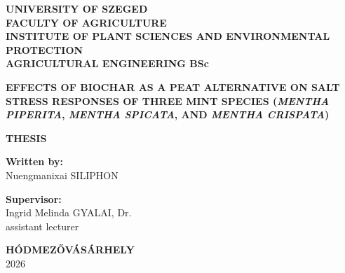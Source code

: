 \begin{titlepage}

\noindent
\textbf{UNIVERSITY OF SZEGED}\\
\textbf{FACULTY OF AGRICULTURE}\\
\textbf{INSTITUTE OF PLANT SCIENCES AND ENVIRONMENTAL PROTECTION}\\
\textbf{AGRICULTURAL ENGINEERING BSc}

\vspace{3cm}

\begin{center}
\fontsize{14}{16}\selectfont
\textbf{
EFFECTS OF BIOCHAR AS A PEAT ALTERNATIVE ON SALT STRESS RESPONSES OF THREE MINT SPECIES (\textit{MENTHA PIPERITA}, \textit{MENTHA SPICATA}, AND \textit{MENTHA CRISPATA})
}
\end{center}

\vspace{3cm}

\begin{center}
\textbf{THESIS}
\end{center}

\vspace{2.5cm}

\begin{center}
\textbf{Written by:}\\
Nuengmanixai SILIPHON
\end{center}

\vspace{2cm}

\begin{center}
\textbf{Supervisor:}\\
Ingrid Melinda GYALAI, Dr.\\
assistant lecturer
\end{center}

\vfill

\begin{center}
\textbf{HÓDMEZŐVÁSÁRHELY}\\
2026
\end{center}

\end{titlepage}